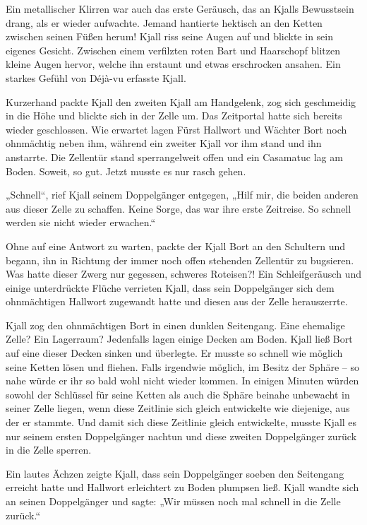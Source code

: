 \trennzeichen



Ein metallischer Klirren war auch das erste Geräusch, das an Kjalls Bewusstsein drang, als er wieder aufwachte. Jemand hantierte hektisch an den Ketten zwischen seinen Füßen herum! Kjall riss seine Augen auf und blickte in sein eigenes Gesicht. Zwischen einem verfilzten roten Bart und Haarschopf blitzen kleine Augen hervor, welche ihn erstaunt und etwas erschrocken ansahen. Ein starkes Gefühl von Déjà-vu erfasste Kjall.

Kurzerhand packte Kjall den zweiten Kjall am Handgelenk, zog sich geschmeidig in die Höhe und blickte sich in der Zelle um. Das Zeitportal hatte sich bereits wieder geschlossen. Wie erwartet lagen Fürst Hallwort und Wächter Bort noch ohnmächtig neben ihm, während ein zweiter Kjall vor ihm stand und ihn anstarrte. Die Zellentür stand sperrangelweit offen und ein Casamatuc lag am Boden. Soweit, so gut. Jetzt musste es nur rasch gehen.

„Schnell“, rief Kjall seinem Doppelgänger entgegen, „Hilf mir, die beiden anderen aus dieser Zelle zu schaffen. Keine Sorge, das war ihre erste Zeitreise. So schnell werden sie nicht wieder erwachen.“

Ohne auf eine Antwort zu warten, packte der Kjall Bort an den Schultern und begann, ihn in Richtung der immer noch offen stehenden Zellentür zu bugsieren. Was hatte dieser Zwerg nur gegessen, schweres Roteisen?! Ein Schleifgeräusch und einige unterdrückte Flüche verrieten Kjall, dass sein Doppelgänger sich dem ohnmächtigen Hallwort zugewandt hatte und diesen aus der Zelle herauszerrte.

Kjall zog den ohnmächtigen Bort in einen dunklen Seitengang. Eine ehemalige Zelle? Ein Lagerraum? Jedenfalls lagen einige Decken am Boden. Kjall ließ Bort auf eine dieser Decken sinken und überlegte. Er musste so schnell wie möglich seine Ketten lösen und fliehen. Falls irgendwie möglich, im Besitz der Sphäre – so nahe würde er ihr so bald wohl nicht wieder kommen. In einigen Minuten würden sowohl der Schlüssel für seine Ketten als auch die Sphäre beinahe unbewacht in seiner Zelle liegen, wenn diese Zeitlinie sich gleich entwickelte wie diejenige, aus der er stammte. Und damit sich diese Zeitlinie gleich entwickelte, musste Kjall es nur seinem ersten Doppelgänger nachtun und diese zweiten Doppelgänger zurück in die Zelle sperren.

Ein lautes Ächzen zeigte Kjall, dass sein Doppelgänger soeben den Seitengang erreicht hatte und Hallwort erleichtert zu Boden plumpsen ließ. Kjall wandte sich an seinen Doppelgänger und sagte: „Wir müssen noch mal schnell in die Zelle zurück.“

